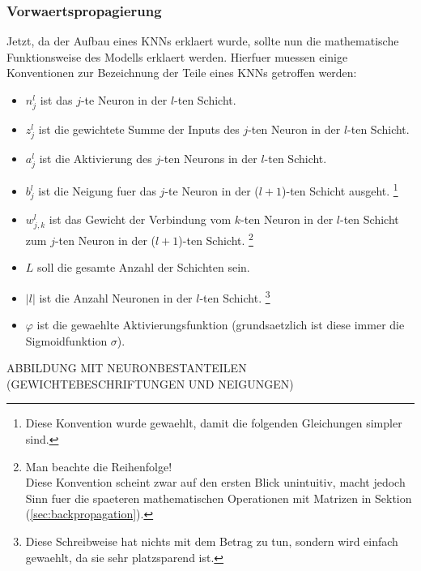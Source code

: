 \documentclass[../main]{subfiles}
\begin{document}
\subsubsection{Vorwaertspropagierung}
Jetzt, da der Aufbau eines KNNs erklaert wurde, sollte nun die mathematische Funktionsweise
des Modells erklaert werden. Hierfuer muessen einige Konventionen zur
Bezeichnung der Teile eines KNNs getroffen werden:

\begin{itemize}

\item{$n_j^l$ ist das $j$-te Neuron in der $l$-ten Schicht.}
\item{$z_j^l$ ist die gewichtete Summe der Inputs des $j$-ten Neuron in der $l$-ten Schicht.}
\item{$a_j^l$ ist die Aktivierung des $j$-ten Neurons in der $l$-ten Schicht.}
\item{$b_j^l$ ist die Neigung fuer das $j$-te Neuron in der ($l+1$)-ten Schicht ausgeht.
    \footnote{
      Diese Konvention wurde gewaehlt, damit die folgenden Gleichungen simpler sind.
    }
  }
\item{$w_{j,k}^l$ ist das Gewicht der Verbindung vom $k$-ten Neuron
    in der $l$-ten Schicht zum $j$-ten Neuron in der ($l+1$)-ten Schicht.
    \footnote{
      Man beachte die Reihenfolge!\\
      Diese Konvention scheint zwar auf den ersten Blick unintuitiv, macht jedoch
      Sinn fuer die spaeteren mathematischen Operationen mit Matrizen in Sektion
      (\ref{sec:backpropagation}).
    }}

\item{$L$ soll die gesamte Anzahl der Schichten sein.}

\item{$|l|$ ist die Anzahl Neuronen in der $l$-ten Schicht.
    \footnote{
      Diese Schreibweise hat nichts mit dem Betrag zu tun, sondern wird einfach
      gewaehlt, da sie sehr platzsparend ist.
    }
  }

\item{$\varphi$ ist die gewaehlte Aktivierungsfunktion (grundsaetzlich ist diese
    immer die Sigmoidfunktion $\sigma$).}

\end{itemize}

ABBILDUNG MIT NEURONBESTANTEILEN (GEWICHTEBESCHRIFTUNGEN UND NEIGUNGEN)
\end{document}
